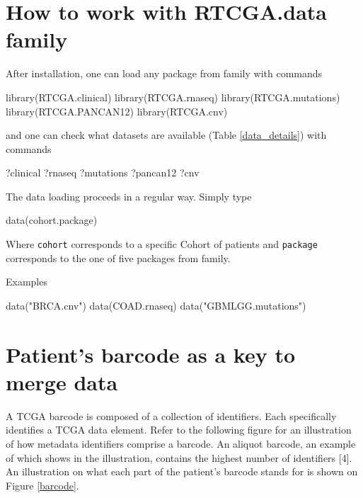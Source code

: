 \normalsize

\section{How to work with RTCGA.data
family}\label{how-to-work-with-rtcga.data-family}

After installation, one can load any package from 
family with commands

\begin{Schunk}
\begin{Sinput}
library(RTCGA.clinical)
library(RTCGA.rnaseq)
library(RTCGA.mutations)
library(RTCGA.PANCAN12)
library(RTCGA.cnv)
\end{Sinput}
\end{Schunk}

and one can check what datasets are available (Table \ref{data_details})
with commands

\begin{Schunk}
\begin{Sinput}
?clinical
?rnaseq
?mutations
?pancan12
?cnv
\end{Sinput}
\end{Schunk}

The data loading proceeds in a regular way. Simply type

\begin{Schunk}
\begin{Sinput}
data(cohort.package)
\end{Sinput}
\end{Schunk}

Where \texttt{cohort} corresponds to a specific Cohort of patients and
\texttt{package} corresponds to the one of five packages from
 family.

Examples

\begin{Schunk}
\begin{Sinput}
data("BRCA.cnv")
data(COAD.rnaseq)
data("GBMLGG.mutations")
\end{Sinput}
\end{Schunk}

\section{Patient's barcode as a key to merge
data}\label{patients-barcode-as-a-key-to-merge-data}

A TCGA barcode is composed of a collection of identifiers. Each
specifically identifies a TCGA data element. Refer to the following
figure for an illustration of how metadata identifiers comprise a
barcode. An aliquot barcode, an example of which shows in the
illustration, contains the highest number of identifiers {[}4{]}. An
illustration on what each part of the patient's barcode stands for is
shown on Figure \ref{barcode}.

